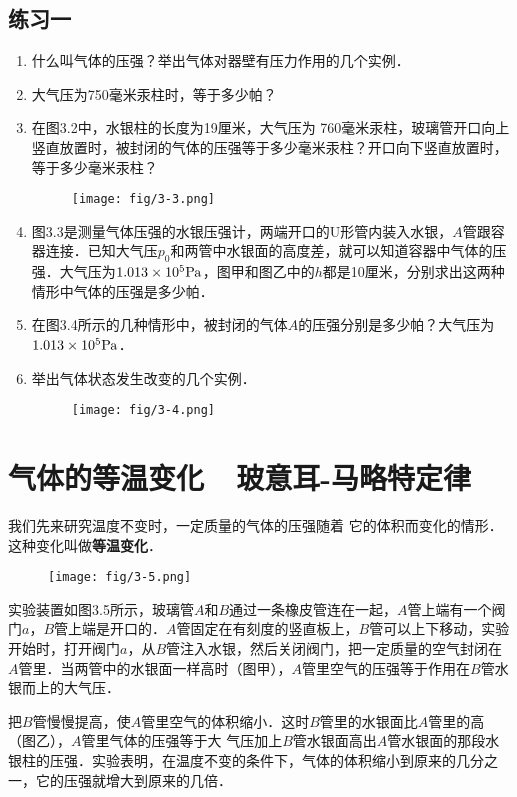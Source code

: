 \subsection*{练习一}
\begin{enumerate}
	\item 什么叫气体的压强？举出气体对器壁有压力作用的几个实例．
	\item 大气压为750毫米汞柱时，等于多少帕？
		\item 在图3.2中，水银柱的长度为19厘米，大气压为
	760毫米汞柱，玻璃管开口向上竖直放置时，被封闭的气体的压强等于多少毫米汞柱？开口向下竖直放置时，等于多少毫米汞柱？
\begin{figure}[htp]\centering
	\texttt{[image: fig/3-3.png]}
	\caption{}
\end{figure}


	\item 图3.3是测量气体压强的水银压强计，两端开口的U形管内装入水银，$A$管跟容器连接．已知大气压$p_0$和两管中水银面的高度差，就可以知道容器中气体的压强．大气压为$1.013\times 10^5{\rm Pa}$，图甲和图乙中的$h$都是10厘米，分别求出这两种情形中气体的压强是多少帕．
	\item 在图3.4所示的几种情形中，被封闭的气体$A$的压强分别是多少帕？大气压为$1.013\times 10^5{\rm Pa}$．
	\item 举出气体状态发生改变的几个实例．
\begin{figure}[htp]\centering
	\texttt{[image: fig/3-4.png]}
	\caption{}
\end{figure}

\end{enumerate}

\section{气体的等温变化~~玻意耳-马略特定律}
我们先来研究温度不变时，一定质量的气体的压强随着
它的体积而变化的情形．这种变化叫做\textbf{等温变化}．
\begin{figure}[htp]\centering
	\texttt{[image: fig/3-5.png]}
	\caption{}
\end{figure}

实验装置如图3.5所示，玻璃管$A$和$B$通过一条橡皮管连在一起，$A$管上端有一个阀门$a$，$B$管上端是开口的．$A$管固定在有刻度的竖直板上，$B$管可以上下移动，实验开始时，打开阀门$a$，从$B$管注入水银，然后关闭阀门，把一定质量的空气封闭在$A$管里．当两管中的水银面一样高时（图甲），$A$管里空气的压强等于作用在$B$管水银而上的大气压．

把$B$管慢慢提高，使$A$管里空气的体积缩小．这时$B$管里的水银面比$A$管里的高（图乙），$A$管里气体的压强等于大
气压加上$B$管水银面高出$A$管水银面的那段水银柱的压强．实验表明，在温度不变的条件下，气体的体积缩小到原来的几分之一，它的压强就增大到原来的几倍．

